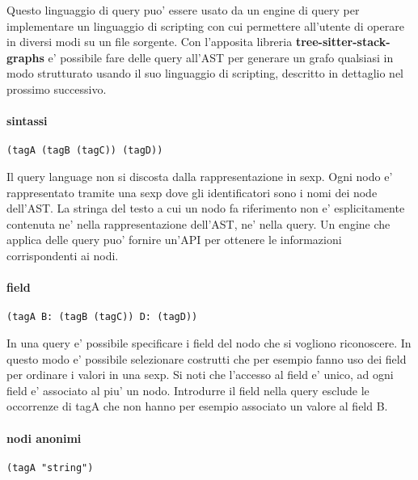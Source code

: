 Questo linguaggio di query puo' essere usato da un engine di query per implementare un linguaggio di scripting con cui permettere all'utente di operare in diversi modi su un file sorgente.
Con l'apposita libreria \textbf{tree-sitter-stack-graphs} e' possibile fare delle query all'AST per generare un grafo qualsiasi in modo strutturato usando il suo linguaggio di scripting, descritto in dettaglio nel prossimo successivo.

\paragraph{sintassi}

\begin{Verbatim}[samepage=true]
(tagA (tagB (tagC)) (tagD))
\end{Verbatim}

Il query language non si discosta dalla rappresentazione in sexp.
Ogni nodo e' rappresentato tramite una sexp dove gli identificatori sono i nomi dei node dell'AST.
La stringa del testo a cui un nodo fa riferimento non e' esplicitamente contenuta ne' nella rappresentazione dell'AST, ne' nella query.
Un engine che applica delle query puo' fornire un'API per ottenere le informazioni corrispondenti ai nodi.

\paragraph{field}

\begin{Verbatim}[samepage=true]
(tagA B: (tagB (tagC)) D: (tagD))
\end{Verbatim}

In una query e' possibile specificare i field del nodo che si vogliono riconoscere.
In questo modo e' possibile selezionare costrutti che per esempio fanno uso dei field per ordinare i valori in una sexp.
Si noti che l'accesso al field e' unico, ad ogni field e' associato al piu' un nodo.
Introdurre il field nella query esclude le occorrenze di tagA che non hanno per esempio associato un valore al field B.

\paragraph{nodi anonimi}

\begin{Verbatim}[samepage=true]
(tagA "string")
\end{Verbatim}

